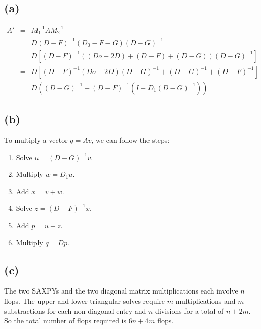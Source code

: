 \documentclass[11pt]{article}
\theoremstyle{definition}
\theoremstyle{remark}
\newcommand{\newpart}{\vspace{-0.5\baselineskip}\hrulefill\vspace{-1.3\baselineskip}}
\theoremstyle{plain}
\begin{document}
\newpart
\subsection*{(a)}
\begin{eqnarray*}
  A'&=&M_1^{-1}AM_2^{-1}\\
    &=&D\left( D-F\right) ^{-1}\left( D_{0}-F-G\right) \left( D-G\right) ^{-1}\\
    &=&D\left[ \left( D-F\right) ^{-1}\left( \left( Do-2D\right) +\left( D-F\right) +\left( D-G\right) \right) \left( D-G\right) ^{-1}\right] \\
    &=&D\left[ \left( D-F\right) ^{-1}\left( Do-2D\right) \left( D-G\right) ^{-1}+\left( D-G\right) ^{-1}+\left( D-F\right) ^{-1}\right] \\
    &=&D\left( \left( D-G\right) ^{-1}+\left( D-F\right) ^{-1}\left( I+D_{1}\left( D-G\right) ^{-1}\right) \right) 
\end{eqnarray*}

\newpart
\subsection*{(b)}
To multiply a vector $q=Av$, we can follow the steps:
\begin{enumerate}
\item Solve $u=\left(D-G\right)^{-1}v$.
\item Multiply $w=D_1u$.
\item Add $x=v+w$.
\item Solve $z=\left(D-F\right)^{-1}x$.
\item Add $p=u+z$.
\item Multiply $q=Dp$.
\end{enumerate}

\newpart
\subsection*{(c)}

The two SAXPYs and the two diagonal matrix multiplications each involve $n$ flops. The upper and lower triangular solves require $m$ multiplications and $m$ substractions for each non-diagonal entry and $n$ divisions for a total of $n+2m$. So the total number of flops required is $6n+4m$ flops.
\end{document}
